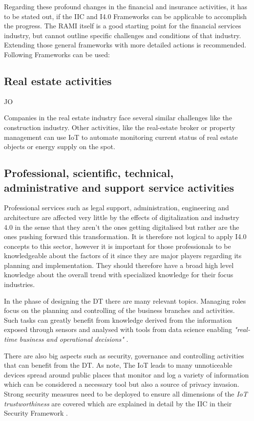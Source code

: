 Regarding these profound changes in the financial and insurance activities, it has to be stated out, if the IIC and I4.0 Frameworks can be applicable to accomplish the progress. The \ac{RAMI} itself is a good starting point for the financial services industry, but cannot outline specific challenges and conditions of that industry. Extending those general frameworks with more detailed actions is recommended. Following Frameworks can be used:


\subsection{Real estate activities}
JO

Companies in the real estate industry face several similar challenges like the construction industry. Other activities, like the real-estate broker or property management can use \ac{IoT} to automate monitoring current status of real estate objects or energy supply on the spot.

\subsection{Professional, scientific, technical, administrative and support service activities}

Professional services such as legal support, administration, engineering and architecture are affected very little by the effects of digitalization and industry 4.0 in the sense that they aren't the ones getting digitalised but rather are the ones pushing forward this transformation. It is therefore not logical to apply \ac{I4.0} concepts to this sector, however it is important for those professionals to be knowledgeable about the factors of it since they are major players regarding its planning and implementation. They should therefore have a broad high level knowledge about the overall trend with specialized knowledge for their focus industries.

In the phase of designing the \ac{DT} there are many relevant topics. Managing roles focus on the planning and controlling of the business branches and activities. Such tasks can greatly benefit from knowledge derived from the information exposed through sensors and analysed with tools from data science enabling \emph{"real-time business and operational decisions"} \cite[p.84]{iicarchitecture:2016}.

There are also big aspects such as security, governance and controlling activities that can benefit from the \ac{DT}. As \citeauthor{Tragos2016trusted} note, The \ac{IoT} leads to many unnoticeable devices spread around public places that monitor and log a variety of information which can be considered a necessary tool but also a source of privacy invasion. Strong security measures need to be deployed to ensure all dimensions of the \emph{\ac{IoT} trustworthiness} are covered which are explained in detail by the \ac{IIC} in their Security Framework \cite{iicsecurity:2016}.

